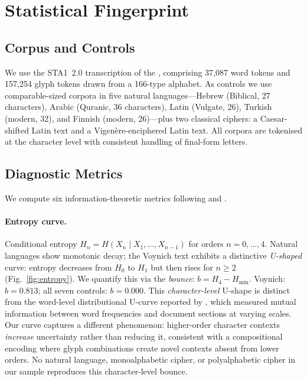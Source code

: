 \section{Statistical Fingerprint}
\label{sec:fingerprint}

\subsection{Corpus and Controls}

We use the STA1~2.0 transcription \citep{zandbergen2022} of the \vms{}, comprising 37,087 word tokens and 157,254 glyph tokens drawn from a 166-type alphabet.  As controls we use comparable-sized corpora in five natural languages---Hebrew (Biblical, 27 characters), Arabic (Quranic, 36 characters), Latin (Vulgate, 26), Turkish (modern, 32), and Finnish (modern, 26)---plus two classical ciphers: a Caesar-shifted Latin text and a Vigen\`ere-enciphered Latin text.  All corpora are tokenised at the character level with consistent handling of final-form letters.

\subsection{Diagnostic Metrics}

We compute six information-theoretic metrics following \citet{shannon1948} and \citet{cover2006}.

\paragraph{Entropy curve.}
Conditional entropy $H_n = H(X_n \mid X_1, \ldots, X_{n-1})$ for orders $n = 0, \ldots, 4$.  Natural languages show monotonic decay; the Voynich text exhibits a distinctive \emph{U-shaped} curve: entropy decreases from $H_0$ to $H_1$ but then rises for $n \geq 2$ (Fig.~\ref{fig:entropy}).  We quantify this via the \emph{bounce}: $b = H_4 - H_{\min}$.  Voynich: $b = 0.813$; all seven controls: $b = 0.000$.  This \emph{character-level} U-shape is distinct from the word-level distributional U-curve reported by \citet{montemurro2013}, which measured mutual information between word frequencies and document sections at varying scales.  Our curve captures a different phenomenon: higher-order character contexts \emph{increase} uncertainty rather than reducing it, consistent with a compositional encoding where glyph combinations create novel contexts absent from lower orders.  No natural language, monoalphabetic cipher, or polyalphabetic cipher in our sample reproduces this character-level bounce.

